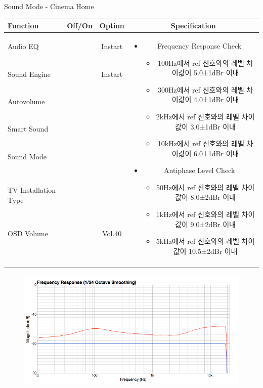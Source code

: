 \begin{frame}[t]{Sound Mode - Cinema Home}
\begin{tiny}
\begin{tabular}{@{}lccc@{}}
\toprule
Function & Off/On & Option & Specification \\
\midrule
Audio EQ & \color{black}{Off} & Instart &
\multirow{10}{60mm}{
\begin{itemize}
\item Frequency Response Check
	\begin{itemize}
	\item 100Hz에서 ref 신호와의 레벨 차이값이 5.0±1dBr 이내
	\item 300Hz에서 ref 신호와의 레벨 차이값이 4.0±1dBr 이내
	\item 2kHz에서 ref 신호와의 레벨 차이값이 3.0±1dBr 이내
	\item 10kHz에서 ref 신호와의 레벨 차이값이 6.0±1dBr 이내
	\end{itemize}
\item Antiphase Level Check
	\begin{itemize}
	\item 50Hz에서 ref 신호와의 레벨 차이값이 8.0±2dBr 이내
	\item 1kHz에서 ref 신호와의 레벨 차이값이 9.0±2dBr 이내
	\item 5kHz에서 ref 신호와의 레벨 차이값이 10.5±2dBr 이내
	\end{itemize}
\end{itemize}
} \\
Sound Engine & \color{blue}{On} & Instart & \\
Autovolume & \color{black}{Off} & & \\
Smart Sound & \color{black}{Off} & & \\
Sound Mode & \color{blue}{On} & \color{blue}{Cinema} & \\
TV Installation Type & \color{blue}{On} & \color{black}{Standtype1} & \\
OSD Volume & \color{blue}{On} & Vol.40 & \\
& & & \\
& & & \\
& & & \\
& & & \\
\midrule
\end{tabular}
\end{tiny}

\begin{figure}[b]
\includegraphics[height=0.3\textwidth]{figures/cinema.png}
\end{figure}

\end{frame}

